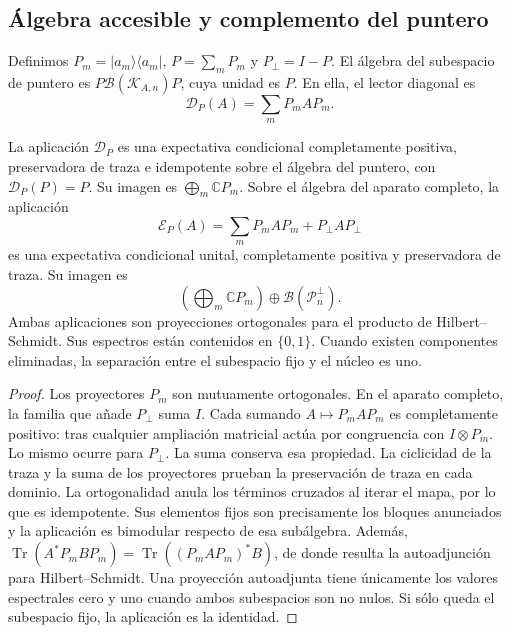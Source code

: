\subsection{Álgebra accesible y complemento del puntero}
\label{vii:vii:sec:observador-expectativa}

Definimos \(P_m=|a_m\rangle\langle a_m|\),
\(P=\sum_mP_m\) y \(P_\perp=I-P\). El álgebra del subespacio de
puntero es \(P\mathcal B(\mathcal K_{A,n})P\), cuya unidad es \(P\).
En ella, el lector diagonal es
\[
 \mathcal D_P(A)=\sum_mP_mAP_m.
\]

\begin{proposition}
\label{vii:vii:prop:observador-pinzamiento}
La aplicación \(\mathcal D_P\) es una expectativa condicional
completamente positiva, preservadora de traza e idempotente sobre el
álgebra del puntero, con \(\mathcal D_P(P)=P\). Su imagen es
\(\bigoplus_m\mathbb CP_m\).
Sobre el álgebra del aparato completo, la aplicación
\begin{equation}
 \mathcal E_P(A)=\sum_mP_mAP_m+P_\perp AP_\perp
 \label{vii:vii:eq:observador-complemento}
\end{equation}
es una expectativa condicional unital, completamente positiva y
preservadora de traza. Su imagen es
\[
 \left(\bigoplus_m\mathbb CP_m\right)
 \oplus\mathcal B(\mathcal P_n^\perp).
\]
Ambas aplicaciones son proyecciones ortogonales para el producto de
Hilbert--Schmidt. Sus espectros están contenidos en \(\{0,1\}\).
Cuando existen componentes eliminadas, la separación entre el
subespacio fijo y el núcleo es uno.
\end{proposition}

\begin{proof}
Los proyectores \(P_m\) son mutuamente ortogonales. En el aparato
completo, la familia que añade \(P_\perp\) suma \(I\). Cada sumando
\(A\mapsto P_mAP_m\) es completamente positivo: tras cualquier
ampliación matricial actúa por congruencia con \(I\otimes P_m\).
Lo mismo ocurre para \(P_\perp\). La suma conserva esa propiedad.
La ciclicidad de la traza y la suma de los proyectores prueban la
preservación de traza en cada dominio. La ortogonalidad anula los
términos cruzados al iterar el mapa, por lo que es idempotente.
Sus elementos fijos son precisamente los bloques anunciados y la
aplicación es bimodular respecto de esa subálgebra.
Además,
\(\operatorname{Tr}(A^*P_mBP_m)
 =\operatorname{Tr}((P_mAP_m)^*B)\),
de donde resulta la autoadjunción para Hilbert--Schmidt. Una proyección
autoadjunta tiene únicamente los valores espectrales cero y uno cuando
ambos subespacios son no nulos. Si sólo queda el subespacio fijo,
la aplicación es la identidad.
\end{proof}

